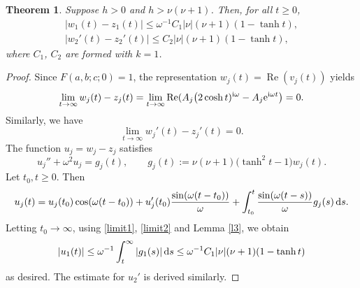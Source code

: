 \documentclass[pdftex]{sigma}
\numberwithin{equation}{section}
\newtheorem{Theorem}{Theorem}[section]
\begin{document}
\begin{Theorem}\label{t2}
Suppose $h>0$ and $h>\nu(\nu+1)$.
Then, for all $t\ge 0$,
\begin{gather*}
 |w_1(t)-z_1(t)|\le \omega^{-1}C_1|\nu|(\nu+1)(1-\tanh t),\\
 |w_2'(t)-z_2'(t)|\le C_2|\nu|(\nu+1)(1-\tanh t),
\end{gather*}
where $C_1$, $C_2$ are formed with $k=1$.
\end{Theorem}
\begin{proof}
Since $F(a,b;c;0)=1$, the representation $w_j(t)=\operatorname{Re}(v_j(t))$ yields
\begin{equation}\label{limit1}
\lim_{t\to\infty} w_j(t)-z_j(t)=\lim_{t\to\infty} \operatorname{Re}(A_j \bigl(2\cosh t)^{{\rm i}\omega}-A_j{\rm e}^{{\rm i}\omega t}\bigr) = 0.
\end{equation}
Similarly, we have
\begin{equation}\label{limit2}
 \lim_{t\to\infty} w_j'(t)-z_j'(t)=0 .
\end{equation}
The function $u_j=w_j-z_j$ satisfies
\[ u_j''+\omega^2 u_j=g_j(t), \qquad g_j(t):=\nu(\nu+1) \bigl(\tanh^2 t-1\bigr) w_j(t) .\]
Let $t_0, t\ge 0$. Then
\[ u_j(t)=u_j(t_0)\cos(\omega (t-t_0))+u_j'(t_0)\frac{\sin(\omega(t-t_0))}{\omega}+
\int_{t_0}^t \frac{\sin(\omega(t-s))}{\omega}g_j(s)\,{\rm d}s .\]
Letting $t_0\to\infty$, using \eqref{limit1}, \eqref{limit2} and Lemma \ref{l3}, we obtain
\[ |u_1(t)|\le\omega^{-1}\int_t^\infty |g_1(s)|\,{\rm d}s \le\omega^{-1}C_1|\nu|(\nu+1)(1-\tanh t) \]
as desired.
The estimate for $u_2'$ is derived similarly.
\end{proof}
\end{document}
